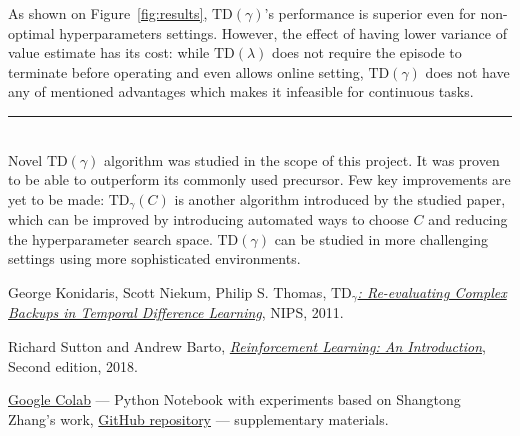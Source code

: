\documentclass[a0]{a0poster}
\def\Head#1{\noindent{\LARGE\color{bluegray} #1}\bigskip}
\begin{document}
\begin{textblock}{7.0}
As shown on Figure~\ref{fig:results}, $\text{TD}(\gamma)$'s performance is
superior even for non-optimal hyperparameters settings. However, the effect of
having lower variance of value estimate has its cost: while
$\text{TD}(\lambda)$ does not require the episode to terminate before operating
and even allows online setting, $\text{TD}(\gamma)$ does not have any of
mentioned advantages which makes it infeasible for continuous tasks.

\medskip
\hrule\medskip
\Head{Conclusion \& Future Work}\\

Novel $\text{TD}(\gamma)$ algorithm was studied in the scope of this project.
It was proven to be able to outperform its commonly used precursor. Few key
improvements are yet to be made: $\text{TD}_{\gamma}(C)$ is another algorithm
introduced by the studied paper, which can be improved by introducing automated
ways to choose $C$ and reducing the hyperparameter search space.
$\text{TD}(\gamma)$ can be studied in more challenging settings using more
sophisticated environments.

\begin{thebibliography}{9}

  George Konidaris, Scott Niekum, Philip S. Thomas,
  \href{https://papers.nips.cc/paper/4472-td_gamma-re-evaluating-complex-backups-in-temporal-difference-learning.pdf}{\color{blue}
  \textit{$\text{TD}_{\gamma}$: Re-evaluating Complex Backups in Temporal
          Difference Learning}},
  NIPS,
  2011.

  Richard Sutton and Andrew Barto,
  \href{http://incompleteideas.net/book/the-book-2nd.html}{\color{blue}\textit{Reinforcement Learning: An Introduction}},
  Second edition,
  2018.

  \href{https://colab.research.google.com/gist/kbobyrev/90efb074a4740f8a8a6abf22e58d988a/td-gamma.ipynb}{\color{blue}Google Colab} ---
  Python Notebook with experiments based on Shangtong Zhang's work,
  \href{https://github.com/omtcvxyz/optimization-class-project}{\color{blue}GitHub repository} --- supplementary materials.

\end{thebibliography}

\end{textblock}
\end{document}
